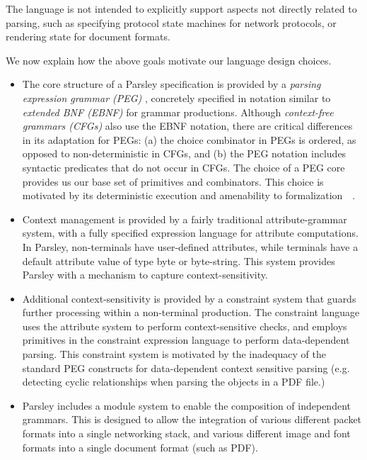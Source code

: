 \documentclass[letterpaper]{article}
\begin{document}
The language is not intended to explicitly support aspects not directly
related to parsing, such as specifying protocol state machines for
network protocols, or rendering state for document formats.

We now explain how the above goals motivate our language design
choices.

\begin{itemize}
\item The core structure of a Parsley specification is provided by a
  {\em parsing expression grammar (PEG)} \cite{ford2004popl},
  concretely specified in notation similar to {\em extended BNF
    (EBNF)} for grammar productions.  Although {\em context-free
    grammars (CFGs)} also use the EBNF notation, there are critical
  differences in its adaptation for PEGs: (a) the choice
  combinator in PEGs is ordered, as opposed to non-deterministic in
  CFGs, and (b) the PEG notation includes syntactic predicates that do
  not occur in CFGs.  The choice of a PEG core provides us our base set of
  primitives and combinators.  This choice is motivated by its
  deterministic execution and amenability to
  formalization~\cite{Blaudeau_2020}~\cite{trx}.

\item Context management is provided by a fairly traditional
  attribute-grammar system, with a fully specified expression language
  for attribute computations.  In Parsley, non-terminals have
  user-defined attributes, while terminals have a default attribute
  value of type byte or byte-string.  This system provides Parsley
  with a mechanism to capture context-sensitivity.

\item Additional context-sensitivity is provided by a constraint
  system that guards further processing within a non-terminal
  production.  The constraint language uses the attribute system to
  perform context-sensitive checks, and employs primitives in the
  constraint expression language to perform data-dependent parsing.
  This constraint system is motivated by the inadequacy of the
  standard PEG constructs for data-dependent context sensitive parsing
  (e.g. detecting cyclic relationships when parsing the objects in a
  PDF file.)

\item Parsley includes a module system to enable the composition of
  independent grammars.  This is designed to allow the integration of
  various different packet formats into a single networking stack, and
  various different image and font formats into a single document
  format (such as PDF).

\end{itemize}
\end{document}

